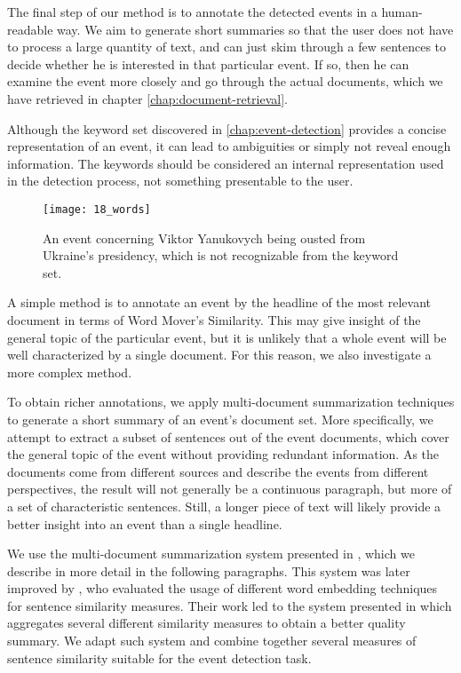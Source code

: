 The final step of our method is to annotate the detected events in a human-readable way. We aim to generate short summaries so that the user does not have to process a large quantity of text, and can just skim through a few sentences to decide whether he is interested in that particular event. If so, then he can examine the event more closely and go through the actual documents, which we have retrieved in chapter \autoref{chap:document-retrieval}.

Although the keyword set discovered in \autoref{chap:event-detection} provides a concise representation of an event, it can lead to ambiguities or simply not reveal enough information. The keywords should be considered an internal representation used in the detection process, not something presentable to the user.


\begin{figure}[H]
  \centering
  \texttt{[image: 18\_words]}  %
  \caption{An event concerning Viktor Yanukovych being ousted from Ukraine's presidency, which is not recognizable from the keyword set.}
  \label{fig:not-recognizable}
\end{figure}


A simple method is to annotate an event by the headline of the most relevant document in terms of Word Mover's Similarity. This may give insight of the general topic of the particular event, but it is unlikely that a whole event will be well characterized by a single document. For this reason, we also investigate a more complex method.

To obtain richer annotations, we apply multi-document summarization techniques to generate a short summary of an event's document set. More specifically, we attempt to extract a subset of sentences out of the event documents, which cover the general topic of the event without providing redundant information. As the documents come from different sources and describe the events from different perspectives, the result will not generally be a continuous paragraph, but more of a set of characteristic sentences. Still, a longer piece of text will likely provide a better insight into an event than a single headline.

We use the multi-document summarization system presented in \cite{multi-summarization-1, multi-summarization-2}, which we describe in more detail in the following paragraphs. This system was later improved by \cite{mogren-1}, who evaluated the usage of different word embedding techniques for sentence similarity measures. Their work led to the system presented in \cite{mogren-2} which aggregates several different similarity measures to obtain a better quality summary. We adapt such system and combine together several measures of sentence similarity suitable for the event detection task.


